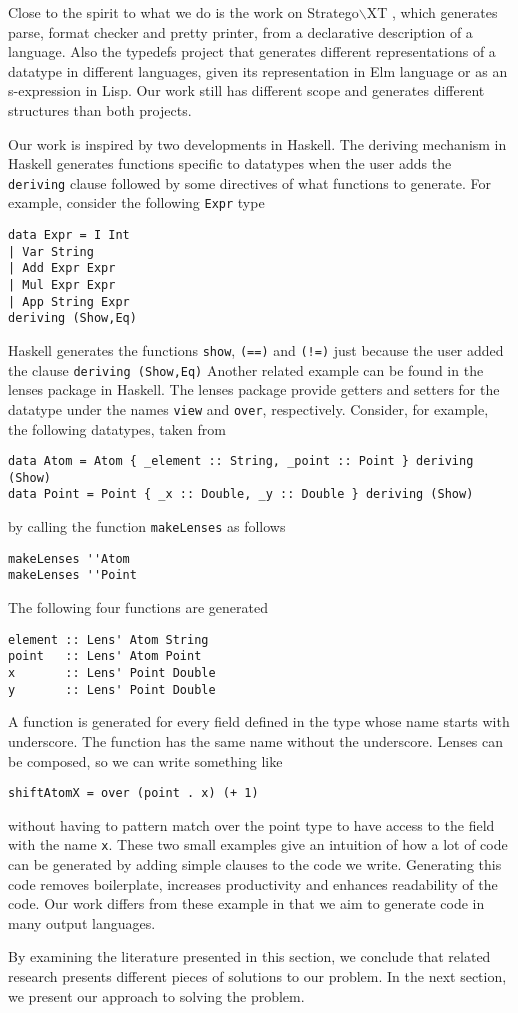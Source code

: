 Close to the spirit to what we do is the work on Stratego$\backslash$XT 
\cite{bravenboer2008stratego}, which generates parse, format checker and pretty printer, from a 
declarative description of a language. Also the typedefs project \cite{typedefs} that generates different 
representations of a datatype in different languages, given its representation in Elm language or as an 
s-expression in Lisp. Our work still has different scope and generates different structures than both 
projects. 

Our work is inspired by two developments in Haskell. The deriving mechanism in Haskell generates 
functions specific to datatypes when the user adds the \verb|deriving| clause followed by 
some directives of what functions to generate. For example, consider the following \verb|Expr| type 
\begin{verbatim}
data Expr = I Int 
| Var String 
| Add Expr Expr 
| Mul Expr Expr 
| App String Expr 
deriving (Show,Eq)
\end{verbatim}
Haskell generates the functions \verb|show|, \verb|(==)| and \verb|(!=)| just because the user 
added the clause \verb|deriving (Show,Eq)|
Another related example can be found in the lenses package in Haskell. The lenses package 
provide getters and setters for the datatype under the names \verb|view| and \verb|over|, 
respectively.  
Consider, for example, the following datatypes, taken from \cite{lenses_tut} 
\begin{verbatim}
data Atom = Atom { _element :: String, _point :: Point } deriving (Show)
data Point = Point { _x :: Double, _y :: Double } deriving (Show)
\end{verbatim}
by calling the function \verb|makeLenses| as follows 
\begin{verbatim}
makeLenses ''Atom
makeLenses ''Point
\end{verbatim}
The following four functions are generated 
\begin{verbatim}
element :: Lens' Atom String
point   :: Lens' Atom Point
x       :: Lens' Point Double
y       :: Lens' Point Double
\end{verbatim}
A function is generated for every field defined in the type whose name starts with underscore. The 
function has the same name without the underscore. Lenses can be composed, so we can write 
something like 
\begin{verbatim}
shiftAtomX = over (point . x) (+ 1)
\end{verbatim}
without having to pattern match over the point type to have access to the field with the name 
\verb|x|. 
These two small examples give an intuition of how a lot of code can be generated by adding simple 
clauses to the code we write. Generating this code removes boilerplate, increases productivity and 
enhances readability of the code. Our work differs from these example in that we aim to generate 
code in many output languages. 

By examining the literature presented in this section, we conclude that related research presents 
different pieces of solutions to our problem. In the next section, we present our approach to solving 
the problem.
